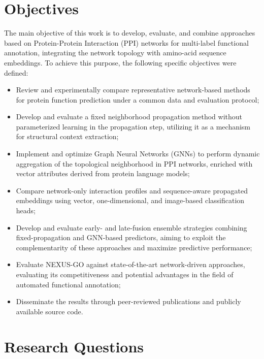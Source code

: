 \documentclass[Ingles]{ic-tese-v3}
\begin{document}
\section{Objectives}

The main objective of this work is to develop, evaluate, and combine approaches based on Protein-Protein Interaction (PPI) networks for multi-label functional annotation, integrating the network topology with amino-acid sequence embeddings. To achieve this purpose, the following specific objectives were defined:

\begin{itemize}

\item Review and experimentally compare representative network-based methods for protein function prediction under a common data and evaluation protocol;

\item Develop and evaluate a fixed neighborhood propagation method without parameterized learning in the propagation step, utilizing it as a mechanism for structural context extraction;

\item Implement and optimize Graph Neural Networks (GNNs) to perform dynamic aggregation of the topological neighborhood in PPI networks, enriched with vector attributes derived from protein language models;

\item Compare network-only interaction profiles and sequence-aware propagated embeddings using vector, one-dimensional, and image-based classification heads;

\item Develop and evaluate early- and late-fusion ensemble strategies combining fixed-propagation and GNN-based predictors, aiming to exploit the complementarity of these approaches and maximize predictive performance;

\item Evaluate NEXUS-GO against state-of-the-art network-driven approaches, evaluating its competitiveness and potential advantages in the field of automated functional annotation;

\item Disseminate the results through peer-reviewed publications and publicly available source code.

\end{itemize}

\section{Research Questions}
\end{document}
